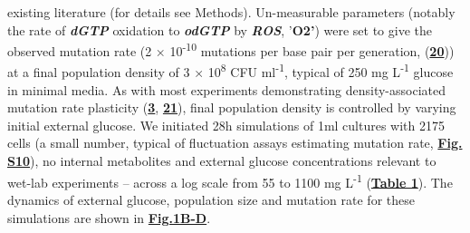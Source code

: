 \documentclass[
  12pt,
  letterpaper,
  DIV=11,
  numbers=noendperiod]{scrreprt}
\begin{document}
existing literature (for details see Methods). Un-measurable parameters
(notably the rate of \textbf{\emph{dGTP}} oxidation to
\textbf{\emph{odGTP}} by \textbf{\emph{ROS}}, '\textbf{O2'}) were set to
give the observed mutation rate (2 × 10\textsuperscript{-10} mutations
per base pair per generation,
(\href{https://www.biorxiv.org/content/10.1101/2023.09.27.557722v1.full\#ref-20}{\textbf{20}}))
at a final population density of 3 × 10\textsuperscript{8} CFU
ml\textsuperscript{-1}, typical of 250 mg L\textsuperscript{-1} glucose
in minimal media. As with most experiments demonstrating
density-associated mutation rate plasticity
(\href{https://www.biorxiv.org/content/10.1101/2023.09.27.557722v1.full\#ref-3}{\textbf{3}},
\href{https://www.biorxiv.org/content/10.1101/2023.09.27.557722v1.full\#ref-21}{\textbf{21}}),
final population density is controlled by varying initial external
glucose. We initiated 28h simulations of 1ml cultures with 2175 cells (a
small number, typical of fluctuation assays estimating mutation rate,
\href{https://www.biorxiv.org/content/10.1101/2023.09.27.557722v1.full\#F14}{\textbf{Fig.
S10}}), no internal metabolites and external glucose concentrations
relevant to wet-lab experiments -- across a log scale from 55 to 1100 mg
L\textsuperscript{-1}
(\href{https://www.biorxiv.org/content/10.1101/2023.09.27.557722v1.full\#T1}{\textbf{Table
1}}). The dynamics of external glucose, population size and mutation
rate for these simulations are shown in
\href{https://www.biorxiv.org/content/10.1101/2023.09.27.557722v1.full\#F1}{\textbf{Fig.1B-D}}.
\end{document}
